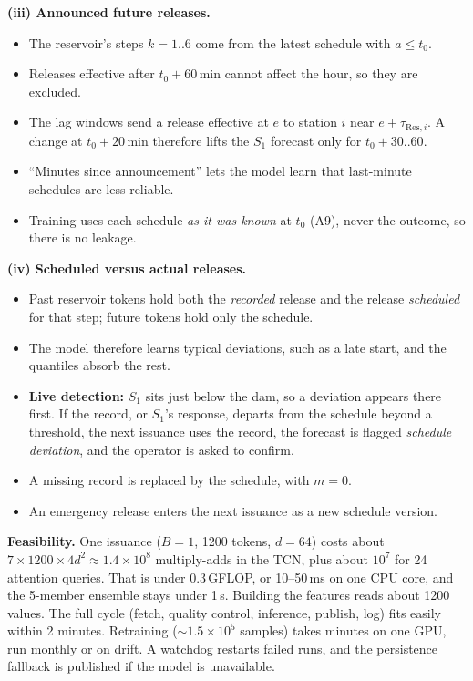 \documentclass[11pt,a4paper]{article}
\newcommand{\Res}{\mathrm{Res}}
\begin{document}
\textbf{(iii) Announced future releases.}
\begin{itemize}
  \item The reservoir's steps $k=1..6$ come from the latest schedule with
        $a\le t_0$.
  \item Releases effective after $t_0+60$\,min cannot affect the hour, so they
        are excluded.
  \item The lag windows send a release effective at $e$ to station $i$ near
        $e+\tau_{\Res,i}$. A change at $t_0+20$\,min therefore lifts the $S_1$
        forecast only for $t_0+30..60$.
  \item ``Minutes since announcement'' lets the model learn that last-minute
        schedules are less reliable.
  \item Training uses each schedule \emph{as it was known} at $t_0$ (A9), never
        the outcome, so there is no leakage.
\end{itemize}

\textbf{(iv) Scheduled versus actual releases.}
\begin{itemize}
  \item Past reservoir tokens hold both the \emph{recorded} release and the
        release \emph{scheduled} for that step; future tokens hold only the
        schedule.
  \item The model therefore learns typical deviations, such as a late start,
        and the quantiles absorb the rest.
  \item \textbf{Live detection:} $S_1$ sits just below the dam, so a deviation
        appears there first. If the record, or $S_1$'s response, departs from
        the schedule beyond a threshold, the next issuance uses the record, the
        forecast is flagged \emph{schedule deviation}, and the operator is
        asked to confirm.
  \item A missing record is replaced by the schedule, with $m=0$.
  \item An emergency release enters the next issuance as a new schedule version.
\end{itemize}

\textbf{Feasibility.} One issuance ($B=1$, 1200 tokens, $d=64$) costs about
$7\times1200\times4d^2\approx1.4\times10^8$ multiply-adds in the TCN, plus
about $10^7$ for 24 attention queries. That is under 0.3\,GFLOP, or 10--50\,ms
on one CPU core, and the 5-member ensemble stays under 1\,s. Building the
features reads about 1200 values. The full cycle (fetch, quality control,
inference, publish, log) fits easily within 2 minutes. Retraining
($\sim\!1.5\times10^5$ samples) takes minutes on one GPU, run monthly or on
drift. A watchdog restarts failed runs, and the persistence fallback is
published if the model is unavailable.
\end{document}
